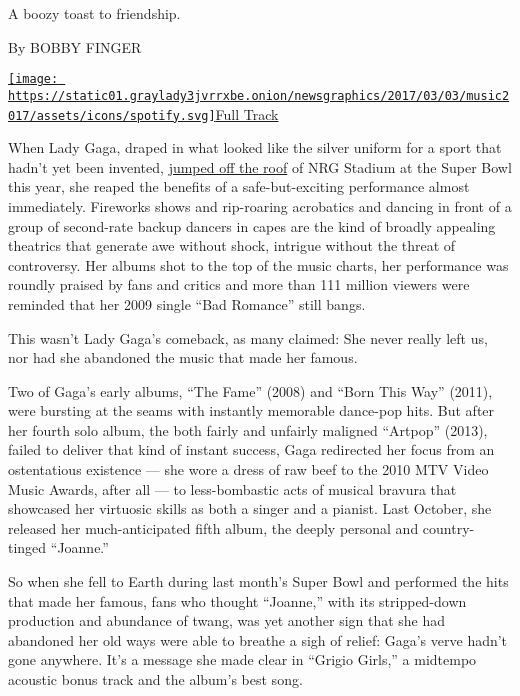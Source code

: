 A boozy toast to friendship.

By BOBBY FINGER

\href{https://open.spotify.com/track/6Xxvdy1m9TX9HTxOzQcfuV}{\texttt{[image: https://static01.graylady3jvrrxbe.onion/newsgraphics/2017/03/03/music2017/assets/icons/spotify.svg]}Full
Track}

When Lady Gaga, draped in what looked like the silver uniform for a
sport that hadn't yet been invented,
\href{https://youtu.be/txXwg712zw4}{jumped off the roof} of NRG Stadium
at the Super Bowl this year, she reaped the benefits of a
safe-but-exciting performance almost immediately. Fireworks shows and
rip-roaring acrobatics and dancing in front of a group of second-rate
backup dancers in capes are the kind of broadly appealing theatrics that
generate awe without shock, intrigue without the threat of controversy.
Her albums shot to the top of the music charts, her performance was
roundly praised by fans and critics and more than 111 million viewers
were reminded that her 2009 single ``Bad Romance'' still bangs.

This wasn't Lady Gaga's comeback, as many claimed: She never really left
us, nor had she abandoned the music that made her famous.

Two of Gaga's early albums, ``The Fame'' (2008) and ``Born This Way''
(2011), were bursting at the seams with instantly memorable dance-pop
hits. But after her fourth solo album, the both fairly and unfairly
maligned ``Artpop'' (2013), failed to deliver that kind of instant
success, Gaga redirected her focus from an ostentatious existence ---
she wore a dress of raw beef to the 2010 MTV Video Music Awards, after
all --- to less-bombastic acts of musical bravura that showcased her
virtuosic skills as both a singer and a pianist. Last October, she
released her much-anticipated fifth album, the deeply personal and
country-tinged ``Joanne.''

So when she fell to Earth during last month's Super Bowl and performed
the hits that made her famous, fans who thought ``Joanne,'' with its
stripped-down production and abundance of twang, was yet another sign
that she had abandoned her old ways were able to breathe a sigh of
relief: Gaga's verve hadn't gone anywhere. It's a message she made clear
in ``Grigio Girls,'' a midtempo acoustic bonus track and the album's
best song.

